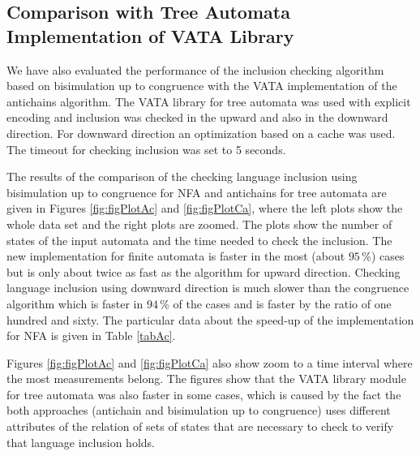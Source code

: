 \subsection{Comparison with Tree Automata Implementation of VATA Library}
We have also evaluated the performance of the inclusion checking algorithm based on bisimulation up to congruence with the VATA implementation of the antichains
algorithm.
The VATA library for tree automata was used with explicit encoding and inclusion was checked in the upward and also in the downward direction. 
For downward direction an optimization based on a cache was used. The timeout for checking inclusion was set to 5 seconds.

The results of the comparison of the checking language inclusion using bisimulation up to congruence for NFA and antichains for tree automata 
are given in Figures \ref{fig:figPlotAc} and \ref{fig:figPlotCa}, where the left plots show the whole data set and the right plots are zoomed. 
The plots show the number of states of the input
automata and the time needed to check the inclusion. The new implementation for finite automata is faster in the
most (about $95\,\%$) cases but is only about twice as fast as the algorithm for upward direction. 
Checking language inclusion using downward direction is much slower than 
the congruence algorithm which is faster in $94\,\%$ of the cases  and is faster by the ratio of one hundred and sixty. The particular data about the speed-up 
of the implementation for NFA is given in Table \ref{tabAc}.

Figures \ref{fig:figPlotAc} and \ref{fig:figPlotCa} also show
zoom to a time interval where the most measurements belong. The figures show that the VATA library module for tree automata was
also faster in some cases, which is caused by the fact the both approaches (antichain and bisimulation up to congruence) uses different attributes of the relation
of sets of states that are necessary to check to verify that language inclusion holds.

